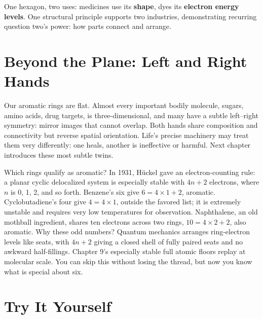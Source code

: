 One hexagon, two uses: medicines use its \textbf{shape}, dyes its \textbf{electron energy levels}. One structural principle supports two industries, demonstrating recurring question two's power: how parts connect and arrange.

\section{Beyond the Plane: Left and Right Hands}

Our aromatic rings are flat. Almost every important bodily molecule, sugars, amino acids, drug targets, is three-dimensional, and many have a subtle left--right symmetry: mirror images that cannot overlap. Both hands share composition and connectivity but reverse spatial orientation. Life's precise machinery may treat them very differently: one heals, another is ineffective or harmful. Next chapter introduces these most subtle twins.

\begin{tiaozhan}
Which rings qualify as aromatic? In 1931, Hückel gave an electron-counting rule: a planar cyclic delocalized system is especially stable with $4n+2$ electrons, where $n$ is 0, 1, 2, and so forth. Benzene's six give $6=4\times 1+2$, aromatic. Cyclobutadiene's four give $4=4\times 1$, outside the favored list; it is extremely unstable and requires very low temperatures for observation. Naphthalene, an old mothball ingredient, shares ten electrons across two rings, $10=4\times 2+2$, also aromatic. Why these odd numbers? Quantum mechanics arranges ring-electron levels like seats, with $4n+2$ giving a closed shell of fully paired seats and no awkward half-fillings. Chapter 9's especially stable full atomic floors replay at molecular scale. You can skip this without losing the thread, but now you know what is special about six.
\end{tiaozhan}

\section*{Try It Yourself}

